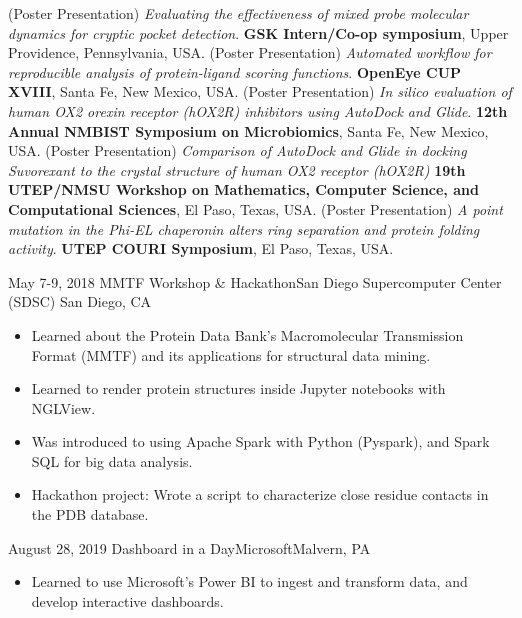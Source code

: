 %
%

\begin{scholarship}
					{(Poster Presentation) \textit{Evaluating the effectiveness of mixed probe molecular dynamics for cryptic pocket detection}.  \textbf{GSK Intern/Co-op symposium}, Upper Providence, Pennsylvania, USA.}
					{(Poster Presentation) \textit{Automated workflow for reproducible analysis of protein-ligand scoring functions}.  \textbf{OpenEye CUP XVIII},  Santa Fe, New Mexico, USA.}
					{(Poster Presentation) \textit{In silico evaluation of human OX2 orexin receptor (hOX2R) inhibitors using AutoDock and Glide}.  \textbf{12th Annual NMBIST Symposium on Microbiomics}, Santa Fe, New Mexico, USA.}
					{(Poster Presentation) \textit{Comparison of AutoDock and Glide in docking Suvorexant to the crystal structure of human OX2 receptor (hOX2R)} \textbf{19th UTEP/NMSU Workshop on Mathematics, Computer Science, and Computational Sciences}, El Paso, Texas, USA.}
					{(Poster Presentation) \textit{A point mutation in the Phi-EL chaperonin alters ring separation and protein folding activity}.  \textbf{ UTEP COURI Symposium}, El Paso, Texas, USA.}
\end{scholarship}

\begin{experiences}
 \experience
    {May 7-9, 2018} {MMTF Workshop \& Hackathon}{San Diego Supercomputer Center (SDSC)}{ San Diego, CA}
    {}    {
        \begin{itemize}
        \item Learned about the Protein Data Bank's Macromolecular Transmission Format (MMTF) and its applications for structural data mining.
        \item Learned to render protein structures inside Jupyter notebooks with NGLView.
        \item Was introduced to using Apache Spark with Python (Pyspark), and Spark SQL for big data analysis.
        \item Hackathon project: Wrote a script to characterize close residue contacts in the PDB database.
        \end{itemize}
    }

\emptySeparator

\experience
    {August 28, 2019} {Dashboard in a Day}{Microsoft}{Malvern, PA}
    {}    {
        \begin{itemize}
        \item Learned to use Microsoft's Power BI to ingest and transform data, and develop interactive dashboards.
        \end{itemize}
    }
\end{experiences}